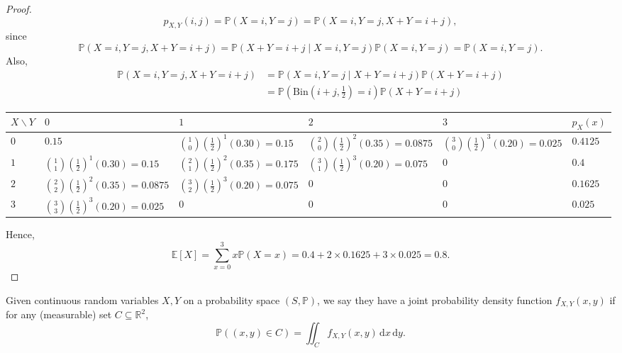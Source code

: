 \begin{proof}
    \[
        p_{X, Y} (i, j) = \mathbb{P} (X = i, Y = j) = \mathbb{P} (X=i, Y=j, X+Y=i+j),
    \]
    since
    \[
        \mathbb{P} (X=i, Y=j, X+Y=i+j) = \mathbb{P} (X+Y=i+j \mid X=i, Y=j) \mathbb{P} (X = i, Y = j) = \mathbb{P} (X = i, Y = j).
    \]
    Also,
    \begin{align*}
        \mathbb{P} (X = i, Y = j, X + Y = i + j) &= \mathbb{P} (X = i, Y = j \mid X + Y = i + j) \mathbb{P} (X + Y = i + j) \\
        &= \mathbb{P} (\mathrm{Bin} \left( i+j, \frac{1}{2} \right) = i) \mathbb{P} (X+Y = i + j)
    \end{align*}
    \begin{table}[H]
    \centering
    \renewcommand{\arraystretch}{1.8}
    \setlength{\tabcolsep}{10pt}
    \begin{tabular}{|>{\centering\arraybackslash}m{1.3cm}|>{\centering\arraybackslash}m{2.7cm}|>{\centering\arraybackslash}m{2.7cm}|>{\centering\arraybackslash}m{2.7cm}|>{\centering\arraybackslash}m{2.2cm}|>{\centering\arraybackslash}m{1.8cm}|}
    \hline
    $X \backslash Y$ & $0$ & $1$ & $2$ & $3$ & $p_X(x)$ \\
    \hline
    $0$ &
    $0.15$ &
    $\binom{1}{0}\left(\tfrac12\right)^1(0.30)=0.15$ &
    $\binom{2}{0}\left(\tfrac12\right)^2(0.35)=0.0875$ &
    $\binom{3}{0}\left(\tfrac12\right)^3(0.20)=0.025$ &
    $0.4125$ \\
    \hline
    $1$ &
    $\binom{1}{1}\left(\tfrac12\right)^1(0.30)=0.15$ &
    $\binom{2}{1}\left(\tfrac12\right)^2(0.35)=0.175$ &
    $\binom{3}{1}\left(\tfrac12\right)^3(0.20)=0.075$ &
    $0$ &
    $0.4$ \\
    \hline
    $2$ &
    $\binom{2}{2}\left(\tfrac12\right)^2(0.35)=0.0875$ &
    $\binom{3}{2}\left(\tfrac12\right)^3(0.20)=0.075$ &
    $0$ &
    $0$ &
    $0.1625$ \\
    \hline
    $3$ &
    $\binom{3}{3}\left(\tfrac12\right)^3(0.20)=0.025$ &
    $0$ &
    $0$ &
    $0$ &
    $0.025$ \\
    \hline
    \end{tabular}
    \end{table}
    Hence,
    \[
        \mathbb{E} [X] = \sum_{x=0}^3 x \mathbb{P} (X = x) = 0.4 + 2 \times 0.1625 + 3 \times 0.025 = 0.8.
    \]
\end{proof}

\begin{definition}
    Given continuous random variables \(X, Y\) on a probability space \((S, \mathbb{P})\), we say they have a joint probability density function \(f_{X, Y} (x, y)\) if for any (measurable) set \(C \subseteq \mathbb{R} ^2\),
    \[
        \mathbb{P} ((x, y) \in C) = \iint_C f_{X, Y}(x, y) \, \mathrm{d} x \, \mathrm{d} y.   
    \]    
\end{definition}

